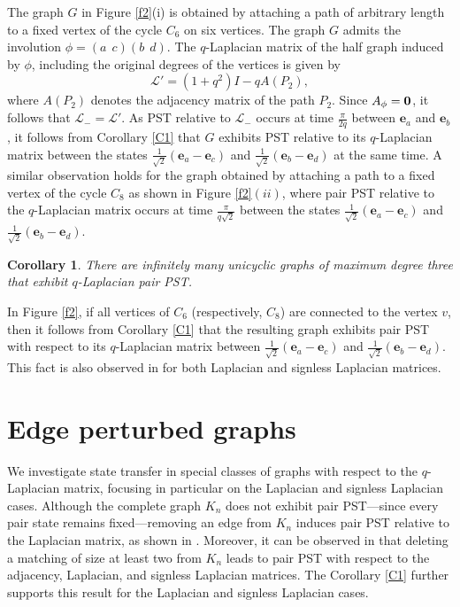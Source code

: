 \documentclass[12pt,a4paper]{article}
\newtheorem{cor}{Corollary}
\def \e {{\mathbf e}}
\def \o {{\bf 0}}
\newcommand{\ob}[1]{\left(#1\right)}
\begin{document}
The graph $G$ in Figure \ref{f2}(i) is obtained by attaching a path of arbitrary length to a fixed vertex of the cycle $C_6$ on six vertices. The graph $G$ admits the involution $\phi=(a~~c)(b~~d)$. The $q$-Laplacian matrix of the half graph induced by $\phi$, including the original degrees of the vertices is given by
\[\mathscr{L}'=\ob{1+q^2}I-q A\ob{P_2},\]
where $A\ob{P_2}$ denotes the adjacency matrix of the path $P_2$. Since $A_{\phi}=\o$, it follows that $\mathscr{L}_{-}=\mathscr{L}'$. As PST relative to $\mathscr{L}_{-}$ occurs at time $\frac{\pi}{2q}$ between $\e_a$ and $\e_b$, it follows from Corollary \ref{C1} that $G$ exhibits PST relative to its $q$-Laplacian matrix between the states $\frac{1}{\sqrt{2}}\ob{\e_a-\e_c}$ and $\frac{1}{\sqrt{2}}\ob{\e_b-\e_d}$ at the same time. A similar observation holds for the graph obtained by attaching a path to a fixed vertex of the cycle $C_8$ as shown in Figure \ref{f2}$(ii)$, where pair PST relative to the $q$-Laplacian matrix occurs at time $\frac{\pi}{q\sqrt{2}}$ between the states $\frac{1}{\sqrt{2}}\left( \mathbf{e}_a - \mathbf{e}_c \right)$ and $\frac{1}{\sqrt{2}}\left( \mathbf{e}_b - \mathbf{e}_d \right)$. 
\begin{cor}
There are infinitely many unicyclic graphs of maximum degree three that exhibit $q$-Laplacian pair PST.
\end{cor}
In Figure \ref{f2}, if all vertices of $C_6$ (respectively, $C_8$) are connected to the vertex $v$, then it follows from Corollary \ref{C1} that the resulting graph exhibits pair PST with respect to its $q$-Laplacian matrix between $\frac{1}{\sqrt{2}}\left( \mathbf{e}_a - \mathbf{e}_c \right)$ and $\frac{1}{\sqrt{2}}\left( \mathbf{e}_b - \mathbf{e}_d \right)$. This fact is also observed in \cite[Theorem 1]{pal9} for both Laplacian and signless Laplacian matrices.

\section{Edge perturbed graphs}\label{sec3}
We investigate state transfer in special classes of graphs with respect to the $q$-Laplacian matrix, focusing in particular on the Laplacian and signless Laplacian cases. Although the complete graph $K_n$ does not exhibit pair PST---since every pair state remains fixed---removing an edge from $K_n$ induces pair PST relative to the Laplacian matrix, as shown in \cite[Corollary 5.4]{chen}. Moreover, it can be observed in \cite[Theorem 4]{pal9} that deleting a matching of size at least two from $K_n$ leads to pair PST with respect to the adjacency, Laplacian, and signless Laplacian matrices. The Corollary \ref{C1} further supports this result for the Laplacian and signless Laplacian cases. 
\end{document}
